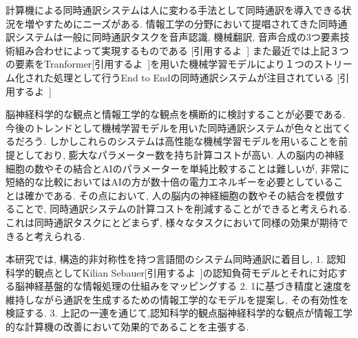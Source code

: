 計算機による同時通訳システムは人に変わる手法として同時通訳を導入できる状況を増やすためにニーズがある.
情報工学の分野において提唱されてきた同時通訳システムは一般に同時通訳タスクを音声認識, 機械翻訳, 音声合成の3つ要素技術組み合わせによって実現するものである [引用するよ~]
また最近では上記３つの要素をTranformer[引用するよ~]を用いた機械学習モデルにより１つのストリーム化された処理として行うEnd to Endの同時通訳システムが注目されている [引用するよ~]


脳神経科学的な観点と情報工学的な観点を横断的に検討することが必要である.
今後のトレンドとして機械学習モデルを用いた同時通訳システムが色々と出てくるだろう.
しかしこれらのシステムは高性能な機械学習モデルを用いることを前提としており, 膨大なパラメーター数を持ち計算コストが高い.
人の脳内の神経細胞の数やその結合とAIのパラメーターを単純比較することは難しいが, 非常に短絡的な比較においてはAIの方が数十倍の電力エネルギーを必要としていることは確かである.
その点において, 人の脳内の神経細胞の数やその結合を模倣することで, 同時通訳システムの計算コストを削減することができると考えられる.
これは同時通訳タスクにとどまらず, 様々なタスクにおいて同様の効果が期待できると考えられる.

本研究では, 構造的非対称性を持つ言語間のシステム同時通訳に着目し, 
1. 認知科学的観点としてKilian Sebauer[引用するよ~]の認知負荷モデルとそれに対応する脳神経基盤的な情報処理の仕組みをマッピングする
2. 1に基づき精度と速度を維持しながら通訳を生成するための情報工学的なモデルを提案し, その有効性を検証する.
3. 上記の一連を通じて,認知科学的観点脳神経科学的な観点が情報工学的な計算機の改善において効果的であることを主張する.